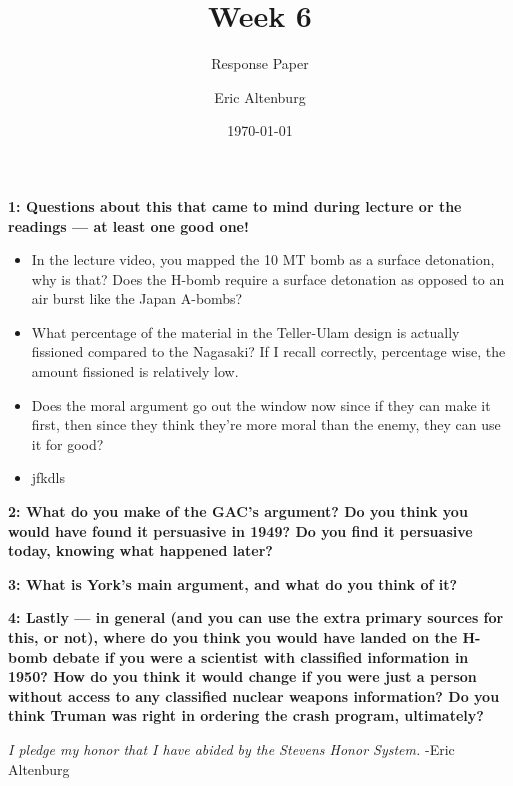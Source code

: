 \documentclass[12pt]{turabian-researchpaper}
\title{Week 6}
\subtitle{Response Paper}
\author{Eric Altenburg}
\date{\today}
\newcommand\question[2]{\noindent\textbf{#1: #2}}
\begin{document}
	\maketitle

	\question{1}{Questions about this that came to mind during lecture or the readings — at least one good one!}

		\begin{itemize}
			\item In the lecture video, you mapped the 10 MT bomb as a surface detonation, why is that? Does the H-bomb require a surface detonation as opposed to an air burst like the Japan A-bombs?
			\item What percentage of the material in the Teller-Ulam design is actually fissioned compared to the Nagasaki? If I recall correctly, percentage wise, the amount fissioned is relatively low.
			\item Does the moral argument go out the window now since if they can make it first, then since they think they're more moral than the enemy, they can use it for good?
			\item jfkdls
		\end{itemize}

	\question{2}{What do you make of the GAC's argument? Do you think you would have found it persuasive in 1949? Do you find it persuasive today, knowing what happened later?}

	\question{3}{What is York's main argument, and what do you think of it?}

	\question{4}{Lastly — in general (and you can use the extra primary sources for this, or not), where do you think you would have landed on the H-bomb debate if you were a scientist with classified information in 1950? How do you think it would change if you were just a person without access to any classified nuclear weapons information? Do you think Truman was right in ordering the crash program, ultimately?}
		

\vspace*{\fill}
\noindent\textit{I pledge my honor that I have abided by the Stevens Honor System.} -Eric Altenburg
\end{document}
